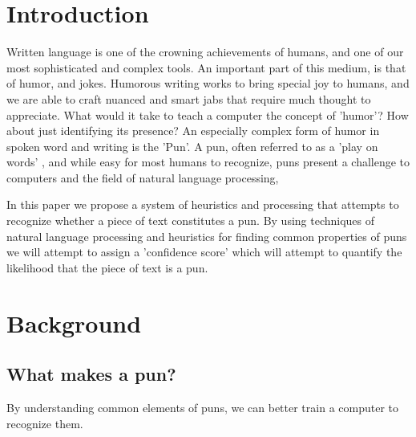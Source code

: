 \section{Introduction}

Written language is one of the crowning achievements of humans, and one of our most sophisticated and complex tools. An important part of this medium, is that of humor, and jokes. Humorous writing works to bring special joy to humans, and we are able to craft nuanced and smart jabs that require much thought to appreciate. What would it take to teach a computer the concept of 'humor'? How about just identifying its presence? An especially complex form of humor in spoken word and writing is the 'Pun'.  A pun, often referred to as a 'play on words' , and while easy for most humans to recognize, puns present a challenge to computers and the field of natural language processing,

In this paper we propose a system of heuristics and processing that attempts to recognize whether a piece of text constitutes a pun. By using techniques of natural language processing and heuristics for finding common properties of puns we will attempt to assign a 'confidence score' which will attempt to quantify the likelihood that the piece of text is a pun.

\section{Background}

\subsection{What makes a pun?}

By understanding common elements of puns, we can better train a computer to recognize them.